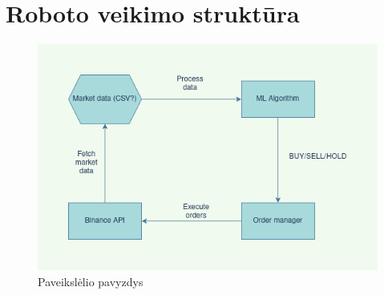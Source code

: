 \documentclass{VUMIFInfKursinis}
\begin{document}
\appendix  %

\section{Roboto veikimo struktūra}
\begin{figure}[H]
  \centering
  \includegraphics[scale=0.5]{img/DIAGRAM}
  \caption{Paveikslėlio pavyzdys}   %
  \label{img:diagram}
\end{figure}
\end{document}
